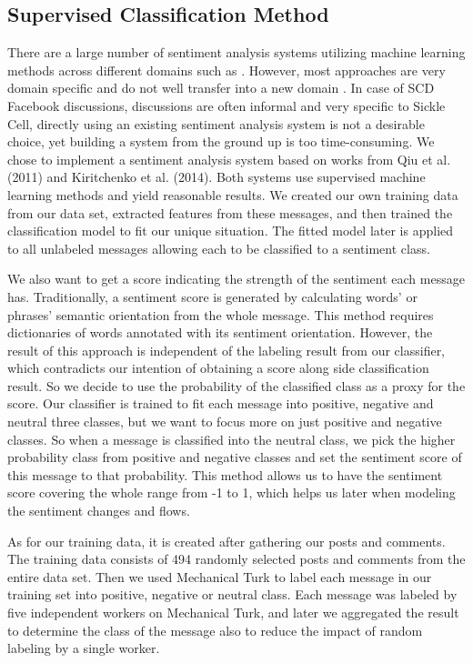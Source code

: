 \documentclass{llncs}
\begin{document}
\subsection{Supervised Classification Method}

There are a large number of sentiment analysis systems utilizing machine learning methods across different domains such as . However, most approaches are very domain specific and do not well transfer into a new domain \cite{Qiu2011}. In case of SCD Facebook discussions, discussions are often informal and very specific to Sickle Cell, directly using an existing sentiment analysis system is not a desirable choice, yet building a system from the ground up is too time-consuming. We chose to implement a sentiment analysis system based on works from Qiu et al. (2011)\cite{Qiu2011} and Kiritchenko et al. (2014)\cite{Kiritchenko2014}. Both systems use supervised machine learning methods and yield reasonable results. We created our own training data from our data set, extracted features from these messages, and then trained the classification model to fit our unique situation. The fitted model later is applied to all unlabeled messages allowing each to be classified to a sentiment class. 

We also want to get a score indicating the strength of the sentiment each message has. Traditionally, a sentiment score is generated by calculating words' or phrases' semantic orientation from the whole message. This method requires dictionaries of words annotated with its sentiment orientation\cite{Taboada2011}.  However, the result of this approach is independent of the labeling result from our classifier, which contradicts our intention of obtaining a score along side classification result. So we decide to use the probability of the classified class as a proxy for the score. Our classifier is trained to fit each message into positive, negative and neutral three classes, but we want to focus more on just positive and negative classes. So when a message is classified into the neutral class, we pick the higher probability class from positive and negative classes and set the sentiment score of this message to that probability. This method allows us to have the sentiment score covering the whole range from -1 to 1, which helps us later when modeling the sentiment changes and flows. 

As for our training data, it is created after gathering our posts and comments. The training data consists of 494 randomly selected posts and comments from the entire data set. Then we used Mechanical Turk to label each message in our training set into positive, negative or neutral class. Each message was labeled by five independent workers on Mechanical Turk, and later we aggregated the result to determine the class of the message also to reduce the impact of random labeling by a single worker. 
\end{document}
